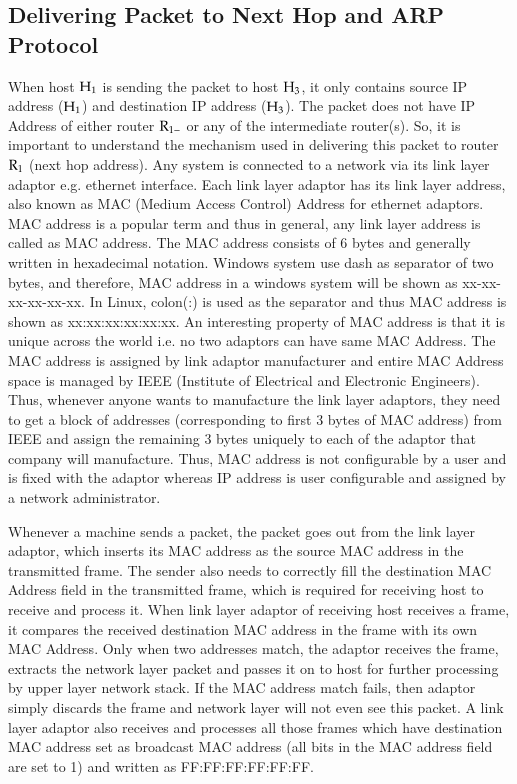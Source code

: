 \begin{multicols}{2}
\section{Delivering Packet to Next Hop and ARP Protocol}\label{chap2-sec3}

When host ${\rm H}_{1}$ is sending the packet to host ${\rm H}_{3}$, it only contains source IP address (${\rm H}_{1}$) and destination IP address (${\rm H}_{3}$). The packet does not have IP Address of either router ${\rm R}_{1-}$ or any of the intermediate router(s). So, it is important to understand the mechanism used in delivering this packet to router ${\rm R}_{1}$ (next hop address). Any system is connected to a network via its link layer adaptor e.g. ethernet interface. Each link layer adaptor has its link layer address, also known as MAC (Medium Access Control) Address for ethernet adaptors. MAC address is a popular term and thus in general, any link layer address is called as MAC address. The MAC address consists of 6 bytes and generally written in hexadecimal notation. Windows system use dash as separator of two bytes, and therefore, MAC address in a windows system will be shown as xx-xx-xx-xx-xx-xx. In Linux, colon(:) is used as the separator and thus MAC address is shown as xx:xx:xx:xx:xx:xx.  An interesting property of MAC address is that it is unique across the world i.e. no two adaptors can have same MAC Address. The MAC address is assigned by link adaptor manufacturer and entire MAC Address space is managed by IEEE (Institute of Electrical and Electronic Engineers). Thus, whenever anyone wants to manufacture the link layer adaptors, they need to get a block of addresses (corresponding to first 3 bytes of MAC address) from IEEE and assign the remaining 3 bytes uniquely to each of the adaptor that company will manufacture. Thus, MAC address is not configurable by a user and is fixed with the adaptor whereas IP address is user configurable and assigned by a network administrator.

Whenever a machine sends a packet, the packet goes out from the link layer adaptor, which inserts its MAC address as the source MAC address in the transmitted frame. The sender also needs to correctly fill the destination MAC Address field in the transmitted frame, which is required for receiving host to receive and process it.  When link layer adaptor of receiving host receives a frame, it compares the received destination MAC address in the frame with its own MAC Address. Only when two addresses match, the adaptor receives the frame, extracts the network layer packet and passes it on to host for further processing by upper layer network stack. If the MAC address match fails, then adaptor simply discards the frame and network layer will not even see this packet. A link layer adaptor also receives and processes all those frames which have destination MAC address set as broadcast MAC address (all bits in the MAC address field are set to 1) and written as FF:FF:FF:FF:FF:FF.


\end{multicols}
